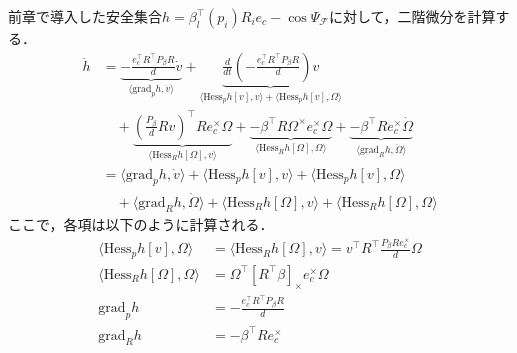 前章で導入した安全集合$h = \beta_l^{\top}(p_i) R_i e_c - \cos \Psi_\mathcal{F}$に対して，二階微分を計算する．
\begin{equation}
\begin{aligned}
\ddot{h} &= \underbrace{-\frac{e_c^\top R^\top P_\beta R}{d} \dot{v}}_{\langle \mathrm{grad}_p h, \dot{v} \rangle} + \underbrace{\frac{d}{dt} \left( -\frac{e_c^\top R^\top P_\beta R}{d} \right) v}_{\langle \mathrm{Hess}_p h[v], v \rangle + \langle \mathrm{Hess}_p h[v], \Omega \rangle} \\
&\quad + \underbrace{\left( \frac{P_\beta}{d} R v \right)^\top R e_c^\times \Omega}_{\langle \mathrm{Hess}_R h[\Omega], v \rangle} + \underbrace{-\beta^\top R \Omega^\times e_c^\times \Omega}_{\langle \mathrm{Hess}_R h[\Omega], \Omega \rangle} + \underbrace{-\beta^\top R e_c^\times \dot{\Omega}}_{\langle \mathrm{grad}_R h, \dot{\Omega} \rangle} \\
&= \langle \mathrm{grad}_p h, \dot{v} \rangle + \langle \mathrm{Hess}_p h[v], v \rangle + \langle \mathrm{Hess}_p h[v], \Omega \rangle \\
&\quad + \langle \mathrm{grad}_R h, \dot{\Omega} \rangle + \langle \mathrm{Hess}_R h[\Omega], v \rangle + \langle \mathrm{Hess}_R h[\Omega], \Omega \rangle
\label{eq:h_second_derivative}
\end{aligned}
\end{equation}
ここで，各項は以下のように計算される．
\begin{equation}
\begin{aligned}
\langle \mathrm{Hess}_p h[v], \Omega \rangle &= \langle \mathrm{Hess}_R h[\Omega], v \rangle = v^\top R^\top \frac{P_\beta R e_c^\times}{d} \Omega \\
\langle \mathrm{Hess}_R h[\Omega], \Omega \rangle &= \Omega^\top [R^\top \beta]_\times e_c^\times \Omega \\
\mathrm{grad}_p h &= -\frac{e_c^\top R^\top P_\beta R}{d} \\
\mathrm{grad}_R h &= -\beta^\top R e_c^\times
\label{eq:h_derivatives}
\end{aligned}
\end{equation}

